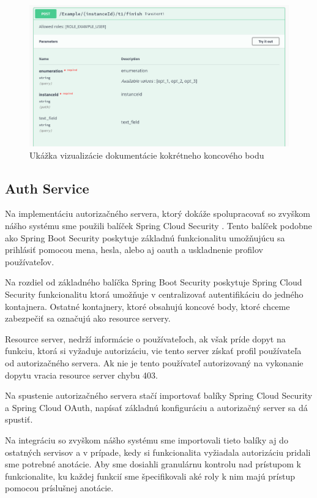 \begin{figure}[!htbp]
	\centering
	\includegraphics[width=16cm]{img/swagger_ui_endpoint.png}
	\caption{Ukážka vizualizácie dokumentácie kokrétneho koncového bodu}
	\label{swagger_ui_endpoint}
\end{figure}



\subsection{Auth Service}  \label{section_auth}

Na implementáciu autorizačného servera, ktorý dokáže spolupracovať so zvyškom nášho systému sme použili balíček Spring Cloud Security \cite{cloud_security}. Tento balíček podobne ako Spring Boot Security poskytuje základnú funkcionalitu umožňujúcu sa prihlásiť pomocou mena, hesla, alebo aj \acrshort{oauth} a uskladnenie profilov používateľov.

Na rozdiel od základného balíčka Spring Boot Security poskytuje Spring Cloud Security funkcionalitu ktorá umožňuje v centralizovať autentifikáciu do jedného kontajnera. Ostatné kontajnery, ktoré obsahujú koncové body, ktoré chceme zabezpečiť sa označujú ako resource servery.

Resource server, nedrží informácie o používateľoch, ak však príde dopyt na funkciu, ktorá si vyžaduje autorizáciu, vie tento server získať profil používateľa od autorizačného servera. Ak nie je tento používateľ autorizovaný na vykonanie dopytu vracia resource server chybu 403.

Na spustenie autorizačného servera stačí importovať balíky  Spring Cloud Security a Spring Cloud OAuth, napísať základnú konfiguráciu a autorizačný server sa dá spustiť.

Na integráciu so zvyškom nášho systému sme importovali tieto balíky aj do ostatných servisov a v prípade, kedy si funkcionalita vyžiadala autorizáciu  pridali sme potrebné anotácie. Aby sme dosiahli granulárnu kontrolu nad prístupom k funkcionalite, ku každej funkcií sme špecifikovali aké roly k nim majú prístup pomocou príslušnej anotácie.

